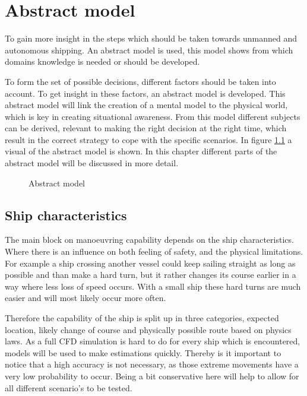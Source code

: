 \chapter{Abstract model}
To gain more insight in the steps which should be taken towards unmanned and autonomous shipping. An abstract model is used, this model shows from which domains knowledge is needed or should be developed. 

To form the set of possible decisions, different factors should be taken into account. To get insight in these factors, an abstract model is developed. This abstract model will link the creation of a mental model to the physical world, which is key in creating situational awareness. From this model different subjects can be derived, relevant to making the right decision at the right time, which result in the correct strategy to cope with the specific scenarios.
In figure \ref{fig:abstract-model} a visual of the abstract model is shown. In this chapter different parts of the abstract model will be discussed in more detail.

\begin{figure}[hb]
	\centering
	\caption{Abstract model}
	\label{fig:abstract-model}
\end{figure}


\section{Ship characteristics}
The main block on manoeuvring capability depends on the ship characteristics. Where there is an influence on both feeling of safety, and the physical limitations. For example a ship crossing another vessel could keep sailing straight as long as possible and than make a hard turn, but it rather changes its course earlier in a way where less loss of speed occurs. With a small ship these hard turns are much easier and will most likely occur more often.

Therefore the capability of the ship is split up in three categories, expected location, likely change of course and physically possible route based on physics laws.
As a full CFD simulation is hard to do for every ship which is encountered, models will be used to make estimations quickly. Thereby is it important to notice that a high accuracy is not necessary, as those extreme movements have a very low probability to occur. Being a bit conservative here will help to allow for all different scenario's to be tested.

